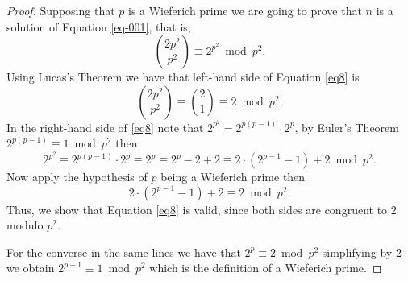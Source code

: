 \documentclass[10pt,a4paper]{amsart}
\begin{document}
\begin{proof}
Supposing that $p$ is a Wieferich prime we are going to prove that $n$ is a solution of Equation \eqref{eq-001}, that is,
\begin{equation}\label{eq8}
\binom{2p^2}{p^2}\equiv2^{p^2} \bmod {p^2}.
\end{equation}
Using Lucas's Theorem  we have that left-hand side of Equation \eqref{eq8} is
$$\binom{2p^2}{p^2}\equiv\binom{2}{1}\equiv 2 \bmod {p^2}.$$ In the right-hand side of \eqref{eq8} note that
$2^{p^2}=2^{p(p-1)}\cdot2^p$,
by Euler's Theorem 
$2^{p(p-1)}\equiv 1 \bmod {p^2}$
then 
$$2^{p^2}\equiv2^{p(p-1)}\cdot2^p\equiv2^p\equiv2^p -2 +2\equiv 2\cdot(2^{p-1}-1) +2 \bmod {p^2}.$$
Now apply the hypothesis of $p$ being a Wieferich prime then
$$2\cdot(2^{p-1}-1) +2\equiv 2 \bmod {p^2.}$$
Thus, we show that Equation \eqref{eq8} is valid, since both sides are congruent to $2$ modulo $p^2$.


For the converse in the same lines we have that
$2^p\equiv 2 \bmod p^2$
simplifying by $2$ we obtain
$2^{p-1}\equiv 1 \bmod {p^2}$
which %
is the definition of a Wieferich prime.
\end{proof}
\end{document}
